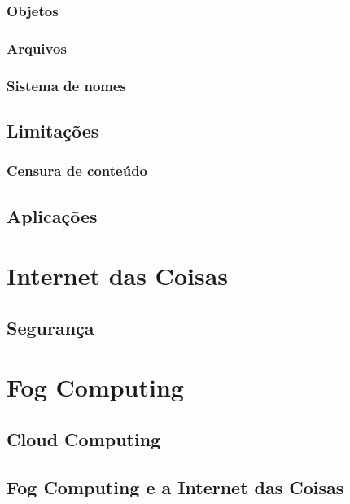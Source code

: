 \documentclass[tcc,capa]{texufpel}
\begin{document}
        \subsubsection{Objetos}
        
        \subsubsection{Arquivos}
        
        \subsubsection{Sistema de nomes}
    
    \subsection{Limitações}
    
    	\subsubsection{Censura de conteúdo}
        
    \subsection{Aplicações}

\section{Internet das Coisas}

	\subsection{Segurança}

\section{Fog Computing}

	\subsection{Cloud Computing}
    
    \subsection{Fog Computing e a Internet das Coisas}
\end{document}
